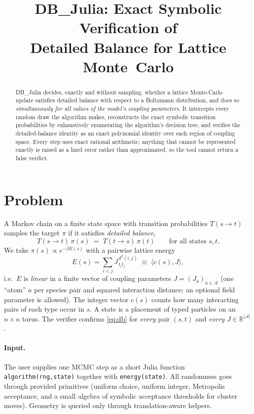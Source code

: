 \documentclass[10pt]{article}
\title{\vspace{-1.2cm}\textbf{DB\_Julia: Exact Symbolic Verification of\\ Detailed Balance for Lattice Monte~Carlo}}
\author{}
\date{}
\newcommand{\code}[1]{\texttt{\small #1}}
\newcommand{\R}{\mathbb{R}}
\begin{document}
\maketitle
\vspace{-1.6cm}

\begin{abstract}
\noindent
DB\_Julia decides, exactly and without sampling, whether a lattice Monte-Carlo
update satisfies detailed balance with respect to a Boltzmann distribution, and
does so \emph{simultaneously for all values of the model's coupling parameters}.
It intercepts every random draw the algorithm makes, reconstructs the exact
symbolic transition probabilities by exhaustively enumerating the algorithm's
decision tree, and verifies the detailed-balance identity as an exact polynomial
identity over each region of coupling space. Every step uses exact rational
arithmetic; anything that cannot be represented exactly is raised as a hard error
rather than approximated, so the tool cannot return a false verdict.
\end{abstract}

\section{Problem}
A Markov chain on a finite state space with transition probabilities $T(s\to t)$
samples the target $\pi$ if it satisfies \emph{detailed balance},
\begin{equation}\label{eq:db}
T(s\to t)\,\pi(s) \;=\; T(t\to s)\,\pi(t)\qquad\text{for all states } s,t .
\end{equation}
We take $\pi(s)\propto e^{-\beta E(s)}$ with a pairwise lattice energy
\begin{equation}\label{eq:energy}
E(s)=\sum_{i<j} J_{\,t_i t_j}^{\,d^2(i,j)}\;\equiv\;\langle c(s),J\rangle ,
\end{equation}
i.e.\ $E$ is \emph{linear} in a finite vector of coupling parameters
$J=(J_a)_{a\in\mathcal{A}}$ (one ``atom'' $a$ per species pair and squared
interaction distance; an optional field parameter is allowed). The integer vector
$c(s)$ counts how many interacting pairs of each type occur in $s$. A state is a
placement of typed particles on an $n\times n$ torus. The verifier confirms
\eqref{eq:db} for \emph{every} pair $(s,t)$ and \emph{every} $J\in\R^{|\mathcal{A}|}$.

\paragraph{Input.} The user supplies one MCMC step as a short Julia function
\code{algorithm(rng,state)} together with \code{energy(state)}. All randomness goes
through provided primitives (uniform choice, uniform integer, Metropolis
acceptance, and a small algebra of symbolic acceptance thresholds for cluster
moves). Geometry is queried only through translation-aware helpers.
\end{document}
